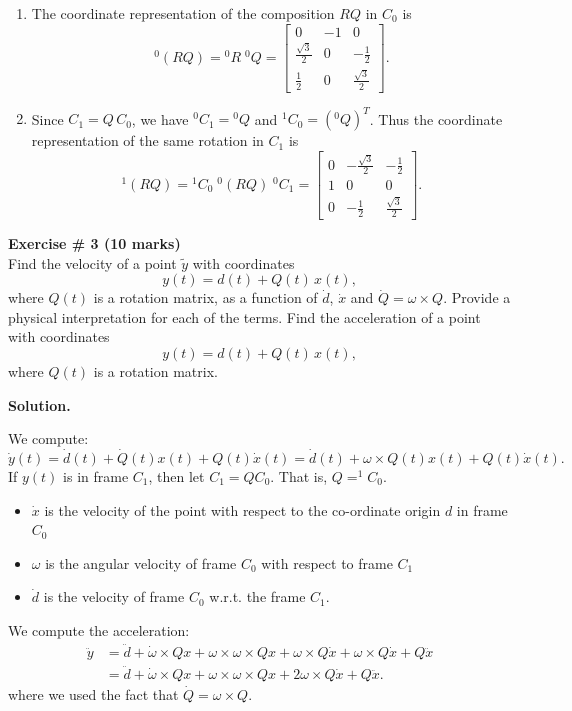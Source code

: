 \documentclass[11pt]{article}
\begin{document}
\begin{enumerate}[label=(\roman*)]
\item The coordinate representation of the composition $RQ$ in $C_0$ is
\[
{}^{0}\!(RQ) = {}^{0}\!R\;{}^{0}\!Q
=
\begin{bmatrix}
0 & -1 & 0\\
\frac{\sqrt{3}}{2} & 0 & -\frac{1}{2}\\
\frac{1}{2} & 0 & \frac{\sqrt{3}}{2}
\end{bmatrix}.
\]

\item Since $C_1 = Q\,C_0$, we have ${}^{0}\!C_1 = {}^{0}\!Q$ and ${}^{1}\!C_0 = ({}^{0}\!Q)^T$.
Thus the coordinate representation of the same rotation in $C_1$ is
\[
{}^{1}\!(RQ) = {}^{1}\!C_0\;{}^{0}\!(RQ)\;{}^{0}\!C_1
=
\begin{bmatrix}
0 & -\frac{\sqrt{3}}{2} & -\frac{1}{2}\\
1 & 0 & 0\\
0 & -\frac{1}{2} & \frac{\sqrt{3}}{2}
\end{bmatrix}.
\]

\end{enumerate}


\vspace{10pt}
\noindent \textbf{Exercise \# 3 (10 marks)}\\
Find the velocity of a point $\tilde{y}$ with coordinates
\[
y(t) = d(t) + Q(t)\,x(t),
\]
where $Q(t)$ is a rotation matrix, as a function of $\dot d$, $\dot x$ and $\dot Q = \omega \times Q$.
Provide a physical interpretation for each of the terms.
Find the acceleration of a point with coordinates
\[
y(t) = d(t) + Q(t)\,x(t),
\]
where $Q(t)$ is a rotation matrix.


\textbf{Solution.}

We compute:
\[
\dot y (t) = \dot d (t) + \dot Q(t) x(t) + Q(t) \dot x(t) = \dot d (t) + \omega \times  Q(t) x(t) + Q(t) \dot x(t)
.\] 
If $y(t)$ is in frame $C_1$, then let $C_1 = QC_0$. That is, $Q = ^1C_0$.

\begin{itemize}
    \item $\dot x$ is the velocity of the point with respect to the co-ordinate origin $d$ in frame $C_0$
    \item $\omega$ is the angular velocity of frame $C_0$ with respect to frame $C_1$
    \item $\dot d$ is the velocity of frame $C_0$ w.r.t. the frame $C_1$.
\end{itemize}
We compute the acceleration:
\begin{align*}
    \ddot y &= \ddot d + \dot \omega \times Q x + \omega \times  \omega \times Q x + \omega \times  Q \dot x + \omega \times  Q \dot x + Q \ddot x\\
            &= \ddot d + \dot \omega \times Q x + \omega \times  \omega \times Q x + 2\omega \times  Q \dot x + Q \ddot x
.\end{align*}
where we used the fact that $\dot Q = \omega \times  Q$.
\end{document}
